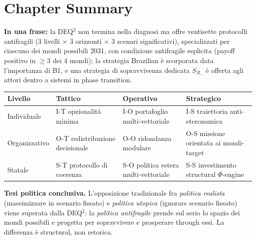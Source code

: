 \section{Chapter Summary}\label{sintesi-del-chapter}

\Proved{} \textbf{In una frase:} la DEQ$^2$ non termina nella diagnosi ma
offre ventisette protocolli antifragili (3 livelli $\times$ 3 orizzonti $\times$ 3
scenari significativi), specializzati per ciascuno dei mondi possibili
2031, con condizione antifragile esplicita (payoff positivo in
\(\geq 3\) dei 4 mondi); la strategia Brazilian è scorporata data
l'importanza di B1, e una strategia di sopravvivenza dedicata
\(S_{\mathcal{R}_-}\) è offerta agli attori dentro a sistemi in
phase transition.

{\def\LTcaptype{none} %
{\small\begin{longtable}[]{@{}
  >{\raggedright\arraybackslash}p{}
  >{\raggedright\arraybackslash}p{}
  >{\raggedright\arraybackslash}p{}
  >{\raggedright\arraybackslash}p{}@{}}
\toprule\noalign{}
\begin{minipage}[b]{\linewidth}\raggedright
Livello
\end{minipage} & \begin{minipage}[b]{\linewidth}\raggedright
Tattico
\end{minipage} & \begin{minipage}[b]{\linewidth}\raggedright
Operativo
\end{minipage} & \begin{minipage}[b]{\linewidth}\raggedright
Strategico
\end{minipage} \\
\midrule\noalign{}
\endhead
\bottomrule\noalign{}
\endlastfoot
Individuale & I-T opzionalità minima & I-O portafoglio multi-vettoriale
& I-S traiettoria anti-eteronomica \\
Organizzativo & O-T redistribuzione decisionale & O-O ridondanza
modulare & O-S missione orientata ai mondi-target \\
Statale & S-T protocollo di coerenza & S-O politica estera
multi-vettoriale & S-S investimento structural \(\Phi\)-engine \\
\end{longtable}}
}

\Hypoth{} \textbf{Tesi politica conclusiva.} L'opposizione tradizionale
fra \emph{politica realista} (massimizzare in scenario fissato) e
\emph{politica utopica} (ignorare scenario fissato) viene superata dalla
DEQ$^2$: la \emph{politica antifragile} prende sul serio lo spazio dei
mondi possibili e progetta per sopravvivere e prosperare through
essi. La differenza è structural, non retorica.



